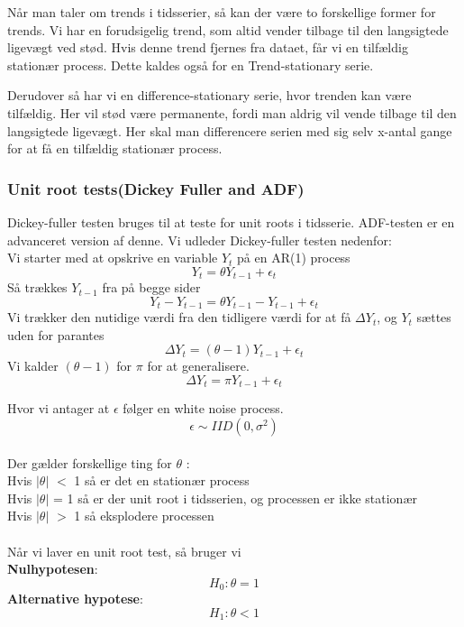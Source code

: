 \documentclass[
  10pt,
]{article}
\begin{document}
Når man taler om trends i tidsserier, så kan der være to forskellige
former for trends. Vi har en forudsigelig trend, som altid vender
tilbage til den langsigtede ligevægt ved stød. Hvis denne trend fjernes
fra dataet, får vi en tilfældig stationær process. Dette kaldes også for
en Trend-stationary serie.

Derudover så har vi en difference-stationary serie, hvor trenden kan
være tilfældig. Her vil stød være permanente, fordi man aldrig vil vende
tilbage til den langsigtede ligevægt. Her skal man differencere serien
med sig selv x-antal gange for at få en tilfældig stationær process.\\

\hypertarget{unit-root-testsdickey-fuller-and-adf}{%
\subsubsection{Unit root tests(Dickey Fuller and
ADF)}\label{unit-root-testsdickey-fuller-and-adf}}

Dickey-fuller testen bruges til at teste for unit roots i tidsserie.
ADF-testen er en advanceret version af denne. Vi udleder Dickey-fuller
testen nedenfor:\\
Vi starter med at opskrive en variable \(Y_t\) på en AR(1) process\\
\[Y_t = \theta Y_{t-1} + \epsilon_t\] Så trækkes \(Y_{t-1}\) fra på
begge sider \[ Y_{t} - Y_{t-1}=\theta Y_{t-1}-Y_{t-1}+\epsilon_{t} \] Vi
trækker den nutidige værdi fra den tidligere værdi for at få
\(\Delta Y_t\), og \(Y_t\) sættes uden for parantes
\[\Delta Y_t=(\theta-1)Y_{t-1}+\epsilon_t    \] Vi kalder \((\theta-1)\)
for \(\pi\) for at generalisere.
\[\Delta Y_t=\pi Y_{t-1} + \epsilon_t    \]

Hvor vi antager at \(\epsilon\) følger en white noise process.\\
\[\epsilon \sim IID(0,\sigma^2)\]\\
Der gælder forskellige ting for \(\theta\) :\\
Hvis \(|\theta|\) \(<\) 1 så er det en stationær process\\
Hvis \(|\theta|\) = 1 så er der unit root i tidsserien, og processen er
ikke stationær\\
Hvis \(|\theta|\) \(>\) 1 så eksplodere processen\\
~\\
Når vi laver en unit root test, så bruger vi\\
\textbf{Nulhypotesen}: \[H_0: \theta = 1 \tag{Unit root} \]
\textbf{Alternative hypotese}: \[H_1: \theta < 1 \tag{No unit root}\]
\end{document}

